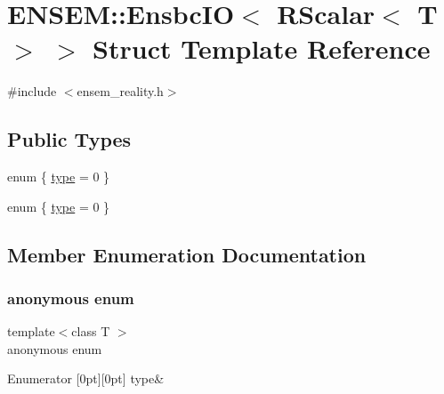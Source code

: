 \hypertarget{structENSEM_1_1EnsbcIO_3_01RScalar_3_01T_01_4_01_4}{}\section{E\+N\+S\+EM\+:\+:Ensbc\+IO$<$ R\+Scalar$<$ T $>$ $>$ Struct Template Reference}
\label{structENSEM_1_1EnsbcIO_3_01RScalar_3_01T_01_4_01_4}


{\ttfamily \#include $<$ensem\+\_\+reality.\+h$>$}

\subsection*{Public Types}
\begin{DoxyCompactItemize}
\item 
enum \{ \mbox{\hyperlink{structENSEM_1_1EnsbcIO_3_01RScalar_3_01T_01_4_01_4_a0f412d1ee6452284f67577ed452dc8d8a2700b782b422b58c4855d989a57b71c1}{type}} = 0
 \}
\item 
enum \{ \mbox{\hyperlink{structENSEM_1_1EnsbcIO_3_01RScalar_3_01T_01_4_01_4_a0f412d1ee6452284f67577ed452dc8d8a2700b782b422b58c4855d989a57b71c1}{type}} = 0
 \}
\end{DoxyCompactItemize}


\subsection{Member Enumeration Documentation}
\mbox{\label{structENSEM_1_1EnsbcIO_3_01RScalar_3_01T_01_4_01_4_a0f412d1ee6452284f67577ed452dc8d8}} 
\subsubsection{\texorpdfstring{anonymous enum}{anonymous enum}}
{\footnotesize\ttfamily template$<$class T $>$ \\
anonymous enum}

\begin{DoxyEnumFields}{Enumerator}
[0pt][0pt]{}\mbox{\label{structENSEM_1_1EnsbcIO_3_01RScalar_3_01T_01_4_01_4_a0f412d1ee6452284f67577ed452dc8d8a2700b782b422b58c4855d989a57b71c1}} 
type&\\
\hline

\end{DoxyEnumFields}
\mbox{\label{structENSEM_1_1EnsbcIO_3_01RScalar_3_01T_01_4_01_4_a80a7eb0f4934e63322b9846e86bb98f7}} 
